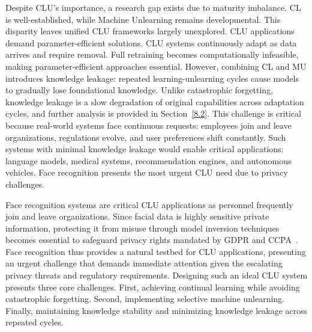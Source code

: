 Despite CLU's importance, a research gap exists due to maturity imbalance. CL is well-established, while Machine Unlearning remains developmental. This disparity leaves unified CLU frameworks largely unexplored. CLU applications demand parameter-efficient solutions. CLU systems continuously adapt as data arrives and require removal. Full retraining becomes computationally infeasible, making parameter-efficient approaches essential. However, combining CL and MU introduces knowledge leakage: repeated learning-unlearning cycles cause models to gradually lose foundational knowledge. Unlike catastrophic forgetting, knowledge leakage is a slow degradation of original capabilities across adaptation cycles, and further analysis is provided in Section~\ref{8.2}. This challenge is critical because real-world systems face continuous requests: employees join and leave organizations, regulations evolve, and user preferences shift constantly. Such systems with minimal knowledge leakage would enable critical applications: language models, medical systems, recommendation engines, and autonomous vehicles. Face recognition presents the most urgent CLU need due to privacy challenges.


Face recognition systems are critical CLU applications as personnel frequently join and leave organizations. Since facial data is highly sensitive private information, protecting it from misuse through model inversion techniques~\cite{fredrikson2015model,zhu2019deep,zhang2020secret} becomes essential to safeguard privacy rights mandated by GDPR and CCPA~\cite{goldman2020introduction,data2018general}. Face recognition thus provides a natural testbed for CLU applications, presenting an urgent challenge that demands immediate attention given the escalating privacy threats and regulatory requirements. Designing such an ideal CLU system presents three core challenges. First, achieving continual learning while avoiding catastrophic forgetting. Second, implementing selective machine unlearning. Finally, maintaining knowledge stability and minimizing knowledge leakage across repeated cycles. 

